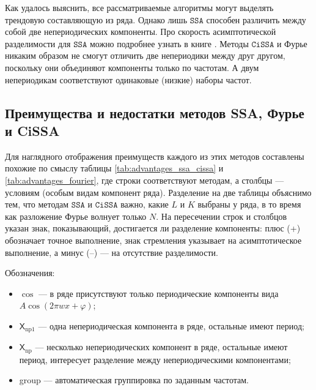 \documentclass[12pt, specialist, subf
]{disser}
\theoremstyle{definition}
\newcommand{\SSA}{\texttt{SSA}}
\newcommand{\CISSA}{\texttt{CiSSA}}
\newcommand{\TS}{\mathsf{X}}
\begin{document}
Как удалось выяснить, все рассматриваемые алгоритмы могут выделять трендовую составляющую из ряда. Однако лишь $\SSA$ способен различить между собой две непериодических компоненты. Про скорость асимптотической разделимости для $\SSA$ можно подробнее узнать в книге \cite{golyandina2001analysis}. Методы $\CISSA$ и Фурье никаким образом не смогут отличить две непериодики между друг другом, поскольку они объединяют компоненты только по частотам. А двум непериодикам соответствуют одинаковые (низкие) наборы частот.


\subsection{Преимущества и недостатки методов SSA, Фурье и CiSSA}

Для наглядного отображения преимуществ каждого из этих методов составлены похожие по смыслу таблицы \ref{tab:advantages_ssa_cissa} и \ref{tab:advantages_fourier}, где строки соответствуют методам, а столбцы --- условиям (особым видам компонент ряда). Разделение на две таблицы объяснимо тем, что методам $\SSA$ и $\CISSA$ важно, какие $L$ и  $K$ выбраны у ряда, в то время как разложение Фурье волнует только $N$. На пересечении строк и столбцов указан знак, показывающий, достигается ли разделение компоненты: плюс (+) обозначает точное выполнение, знак стремления указывает на асимптотическое выполнение, а минус (–) --- на отсутствие разделимости.

Обозначения:
\begin{itemize}
	\item $\cos$ --- в ряде присутствуют только периодические компоненты вида $A\cos(2\pi w x + \varphi)$;
	\item $\TS_{\mathrm{np}1}$ --- одна непериодическая компонента в ряде, остальные имеют период;
	\item $\TS_{\mathrm{np}}$ --- несколько непериодических компонент в ряде, остальные имеют период, интересует разделение между
	      непериодическими компонентами;
	\item group --- автоматическая группировка по заданным частотам.
\end{itemize}
\end{document}
